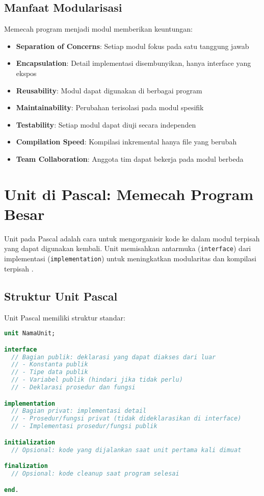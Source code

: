 \documentclass[../main.tex]{subfiles}
\begin{document}
\subsection{Manfaat Modularisasi}
Memecah program menjadi modul memberikan keuntungan:
\begin{itemize}
  \item \textbf{Separation of Concerns}: Setiap modul fokus pada satu tanggung jawab
  \item \textbf{Encapsulation}: Detail implementasi disembunyikan, hanya interface yang ekspos
  \item \textbf{Reusability}: Modul dapat digunakan di berbagai program
  \item \textbf{Maintainability}: Perubahan terisolasi pada modul spesifik
  \item \textbf{Testability}: Setiap modul dapat diuji secara independen
  \item \textbf{Compilation Speed}: Kompilasi inkremental hanya file yang berubah
  \item \textbf{Team Collaboration}: Anggota tim dapat bekerja pada modul berbeda
\end{itemize}

\section{Unit di Pascal: Memecah Program Besar}

Unit pada Pascal adalah cara untuk mengorganisir kode ke dalam modul terpisah yang dapat digunakan kembali. Unit memisahkan antarmuka (\texttt{interface}) dari implementasi (\texttt{implementation}) untuk meningkatkan modularitas dan kompilasi terpisah \parencite{free-pascal-docs,pascal-tutorial-wikibooks}.

\subsection{Struktur Unit Pascal}
Unit Pascal memiliki struktur standar:
\begin{lstlisting}[language=Pascal, caption={Struktur unit Pascal}]
unit NamaUnit;

interface
  // Bagian publik: deklarasi yang dapat diakses dari luar
  // - Konstanta publik
  // - Tipe data publik
  // - Variabel publik (hindari jika tidak perlu)
  // - Deklarasi prosedur dan fungsi

implementation
  // Bagian privat: implementasi detail
  // - Prosedur/fungsi privat (tidak dideklarasikan di interface)
  // - Implementasi prosedur/fungsi publik

initialization
  // Opsional: kode yang dijalankan saat unit pertama kali dimuat

finalization
  // Opsional: kode cleanup saat program selesai

end.
\end{lstlisting}
\end{document}
